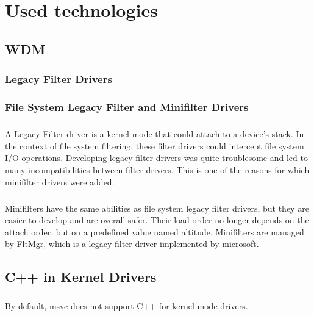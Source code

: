 \chapter{Used technologies}
    \section{WDM}
        \subsection{Legacy Filter Drivers}
        \subsection{File System Legacy Filter and Minifilter Drivers}
            \paragraph{}
            A Legacy Filter driver is a kernel-mode that could attach to a device's stack. In the context of file system filtering, these
            filter drivers could intercept file system I/O operations. Developing legacy filter drivers was quite troublesome and led to 
            many incompatibilities between filter drivers. This is one of the reasons for which minifilter drivers were added.
            \paragraph{}
            Minifilters have the same abilities as file system legacy filter drivers, but they are easier to develop and are overall safer. Their
            load order no longer depends on the attach order, but on a predefined value named altitude. Minifilters are managed by FltMgr, which is
            a legacy filter driver implemented by microsoft.
    \section{C++ in Kernel Drivers}
        \paragraph{}
        By default, msvc does not support C++ for kernel-mode drivers.
        \paragraph{}

    
